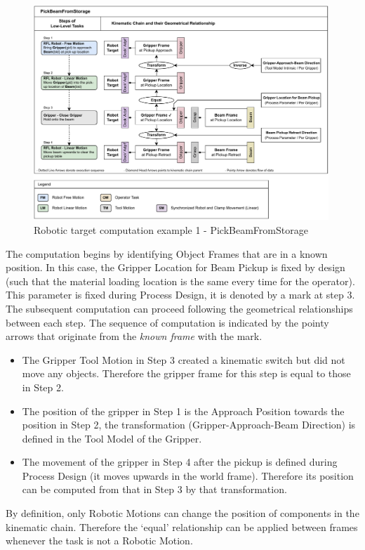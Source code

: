 \begin{figure}[!h]
    \centering
    \includegraphics[width=0.99\textwidth]{images/6a/pick-beam-from-storage.pdf}
    \caption{Robotic target computation example 1 - PickBeamFromStorage}
    \label{fig:exploration-three-low-level-tasks}
\end{figure}

The computation begins by identifying Object Frames that are in a known position. In this case, the Gripper Location for Beam Pickup is fixed by design (such that the material loading location is the same every time for the operator). This parameter is fixed during Process Design, it is denoted by a \checkmark mark at step 3. The subsequent computation can proceed following the geometrical relationships between each step. The sequence of computation is indicated by the pointy arrows that originate from the \textit{known frame} with the \checkmark mark.

\begin{itemize}
	\item The Gripper Tool Motion in Step 3 created a kinematic switch but did not move any objects. Therefore the gripper frame for this step is equal to those in Step 2.

	\item The position of the gripper in Step 1 is the Approach Position towards the position in Step 2, the transformation (Gripper-Approach-Beam Direction) is defined in the Tool Model of the Gripper.

	\item The movement of the gripper in Step 4 after the pickup is defined during Process Design (it moves upwards in the world frame). Therefore its position can be computed from that in Step 3 by that transformation.

\end{itemize}
By definition, only Robotic Motions can change the position of components in the kinematic chain. Therefore the ‘equal’ relationship can be applied between frames whenever the task is not a Robotic Motion.

